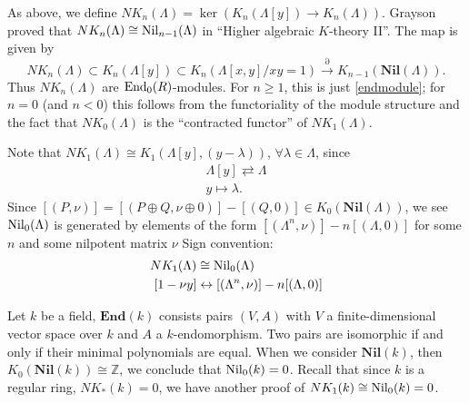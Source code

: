 \begin{definition}[$NK_*$]
	As above, we define $NK_n(\Lambda)=\ker(K_n(\Lambda[y])\longrightarrow K_n(\Lambda))$. Grayson proved that $NK_n(\Lambda)\cong \mathrm{Nil}_{n-1}(\Lambda)$ in ``Higher algebraic $K$-theory II''. The map is given by 
	\[NK_n(\Lambda) \subset K_n(\Lambda[y]) \subset K_n(\Lambda[x,y]/xy=1)\overset{\partial}\longrightarrow K_{n-1}(\mathbf{Nil}(\Lambda)).\]
	Thus $NK_n(\Lambda)$ are $\mathrm{End}_0(R)$-modules. For $n \geq 1$, this is just \ref{endmodule}; for $n = 0$ (and $n < 0$) this follows from the functoriality of the module structure and the fact that $NK_0(\Lambda)$ is the ``contracted functor'' of $NK_1(\Lambda)$.
\end{definition}

Note that $NK_1(\Lambda)\cong K_1(\Lambda[y],(y-\lambda))$, $\forall \lambda\in \Lambda$, since 
\begin{gather*}
	\Lambda[y] \rightleftarrows \Lambda\\
y\mapsto \lambda.
\end{gather*}
Since $[(P,\nu)]=[(P\oplus Q,\nu\oplus 0)]-[(Q,0)]\in K_0(\mathbf{Nil}(\Lambda))$, we see $\mathrm{Nil}_0(\Lambda)$ is generated by elements of the form $[(\Lambda^n,\nu)]-n[(\Lambda,0)]$ for some $n$ and some nilpotent matrix $\nu$
Sign convention:
\begin{align*}
	NK_1(\Lambda) & \cong \mathrm{Nil}_0(\Lambda)\\
[1-\nu y] & \leftrightarrow [(\Lambda^n,\nu)]-n[(\Lambda,0)]
\end{align*}
\begin{example}
	Let $k$ be a field, $\mathbf{End}(k)$ consists pairs $(V,A)$ with $V$ a finite-dimensional vector space over $k$ and $A$ a $k$-endomorphism. Two pairs are isomorphic if and only if their minimal polynomials are equal. When we consider $\mathbf{Nil}(k)$, then $K_0(\mathbf{Nil}(k))\cong \mathbb{Z}$, we conclude that $\mathrm{Nil}_0(k)=0$. Recall that since $k$ is a regular ring, $NK_*(k)=0$, we have another proof of $NK_1(k)\cong \mathrm{Nil}_0(k)=0$.
\end{example}


